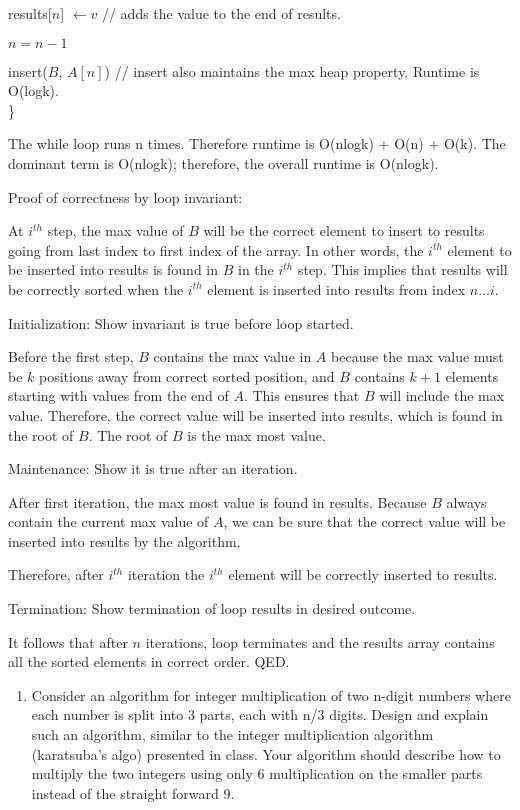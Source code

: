 \documentclass[11pt]{article}
\providecommand{\tightlist}{%
      \setlength{\itemsep}{0pt}\setlength{\parskip}{0pt}}
\begin{document}
results{[}\(n\){]} \(\leftarrow v\) // adds the value to the end of
results.

\(n=n-1\)

insert(\(B\), \(A[n]\)) // insert also maintains the max heap property.
Runtime is O(logk).\\
\}

    The while loop runs n times. Therefore runtime is O(nlogk) + O(n) +
O(k). The dominant term is O(nlogk); therefore, the overall runtime is
O(nlogk).

    Proof of correctness by loop invariant:

At \(i^{th}\) step, the max value of \(B\) will be the correct element
to insert to results going from last index to first index of the array.
In other words, the \(i^{th}\) element to be inserted into results is
found in \(B\) in the \(i^{th}\) step. This implies that results will be
correctly sorted when the \(i^{th}\) element is inserted into results
from index \(n ... i\).

Initialization: Show invariant is true before loop started.

Before the first step, \(B\) contains the max value in \(A\) because the
max value must be \(k\) positions away from correct sorted position, and
\(B\) contains \(k+1\) elements starting with values from the end of
\(A\). This ensures that \(B\) will include the max value. Therefore,
the correct value will be inserted into results, which is found in the
root of \(B\). The root of \(B\) is the max most value.

Maintenance: Show it is true after an iteration.

After first iteration, the max most value is found in results. Because
\(B\) always contain the current max value of \(A\), we can be sure that
the correct value will be inserted into results by the algorithm.

Therefore, after \(i^{th}\) iteration the \(i^{th}\) element will be
correctly inserted to results.

Termination: Show termination of loop results in desired outcome.

It follows that after \(n\) iterations, loop terminates and the results
array contains all the sorted elements in correct order. QED.

    \begin{enumerate}
\def\labelenumi{\arabic{enumi}.}
\setcounter{enumi}{1}
\tightlist
\item
  Consider an algorithm for integer multiplication of two n-digit
  numbers where each number is split into 3 parts, each with n/3 digits.
  Design and explain such an algorithm, similar to the integer
  multiplication algorithm (karatsuba's algo) presented in class. Your
  algorithm should describe how to multiply the two integers using only
  6 multiplication on the smaller parts instead of the straight forward
  9.
\end{enumerate}
\end{document}
